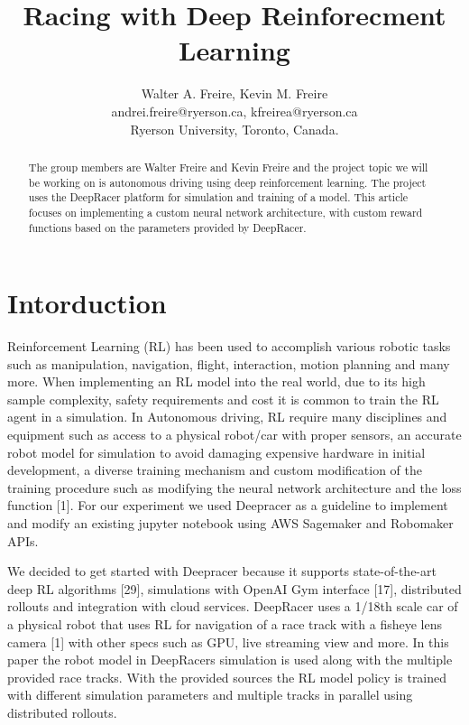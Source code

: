 \documentclass[journal]{IEEEtran}
\begin{document}
\title{Racing with Deep Reinforecment Learning}
\author{Walter A. Freire, Kevin M. Freire\\
andrei.freire@ryerson.ca, kfreirea@ryerson.ca\\
Ryerson University, Toronto, Canada.}
\maketitle
\begin{abstract}
The group members are Walter Freire and Kevin Freire and the project topic we will be working on is autonomous driving using deep reinforcement learning. The project uses the DeepRacer platform for simulation and training of a model. This article focuses on implementing a custom neural network architecture, with custom reward functions based on the parameters provided by DeepRacer.  
\end{abstract}

\section{Intorduction}
Reinforcement Learning (RL) has been used to accomplish various robotic tasks such as manipulation, navigation, flight, interaction, motion planning and many more. When implementing an RL model into the real world, due to its high sample complexity, safety requirements and cost it is common to train the RL agent in a simulation. In Autonomous driving, RL require many disciplines and equipment such as access to a physical robot/car with proper sensors, an accurate robot model for simulation to avoid damaging expensive hardware in initial development, a diverse training mechanism and custom modification of the training procedure such as modifying the neural network architecture and the loss function [1]. For our experiment we used Deepracer as a guideline to implement and modify an existing jupyter notebook using AWS Sagemaker and Robomaker APIs.

We decided to get started with Deepracer because it supports state-of-the-art deep RL algorithms [29], simulations with OpenAI Gym interface [17], distributed rollouts and integration with cloud services. DeepRacer uses a 1/18th scale car of a physical robot that uses RL for navigation of a race track with a fisheye lens camera [1] with other specs such as GPU, live streaming view and more. In this paper the robot model in DeepRacers simulation is used along with the multiple provided race tracks. With the provided sources the RL model policy is trained with different simulation parameters and multiple tracks in parallel using distributed rollouts.
\end{document}
